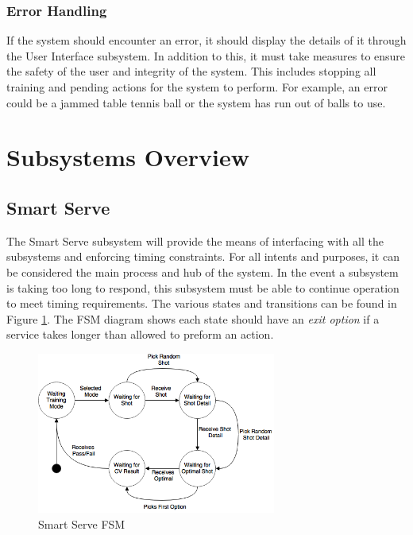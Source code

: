 \documentclass[11pt]{article}
\begin{document}
\subsubsection{Error Handling}
If the system should encounter an error, it should display the details of it through the User Interface subsystem. In addition to this, it must take measures to ensure the safety of the user and integrity of the system. This includes stopping all training and pending actions for the system to perform. For example, an error could be a jammed table tennis ball or the system has run out of balls to use.
\section{Subsystems Overview}
\subsection{Smart Serve}
The Smart Serve subsystem will provide the means of interfacing with all the subsystems and enforcing timing constraints. For all intents and purposes, it can be considered the main process and hub of the system. In the event a subsystem is taking too long to respond, this subsystem must be able to continue operation to meet timing requirements. The various states and transitions can be found in Figure \ref{fig:fsm}. The FSM diagram shows each state should have an \textit{exit option} if a service takes longer than allowed to preform an action.
\begin{figure}[H]
   \centering
   \includegraphics[width=0.7\textwidth]{img/FSM.png}
   \caption{Smart Serve FSM}
   \label{fig:fsm}
\end{figure}
\end{document}
